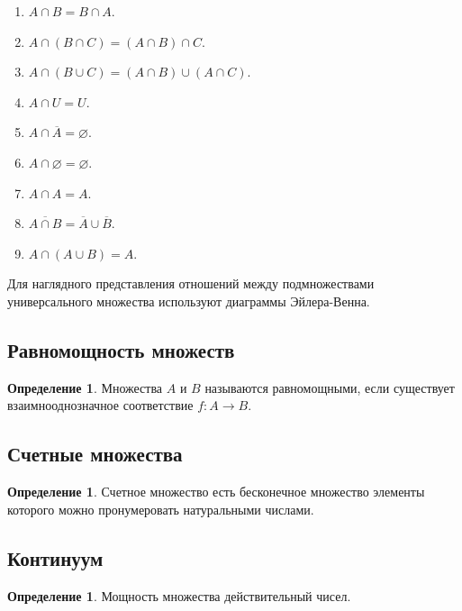 \documentclass[12pt]{report}
\theoremstyle{definition}
\newtheorem{definition}[theorem]{Определение}
\begin{document}
\begin{enumerate}
\item $A \cap B = B \cap A$.
\item $A \cap (B \cap C) = (A \cap B) \cap C$.
\item $A \cap (B \cup C) = (A \cap B) \cup (A \cap C)$.
\item $A \cap U = U$.
\item $A \cap \overline{A} = \varnothing$.
\item $A \cap \varnothing = \varnothing$.
\item $A \cap A = A$.
\item $\overline{A \cap B} = \overline{A} \cup \overline{B}$.
\item $A \cap (A \cup B) = A$.
\end{enumerate}

Для наглядного представления отношений между подмножествами
универсального множества используют диаграммы Эйлера-Венна.

\subsection{Равномощность множеств}
\begin{definition}
Множества $A$ и $B$ называются равномощными, если существует взаимнооднозначное
соответствие $f: A \rightarrow B$.
\end{definition}

\subsection{Счетные множества}
\begin{definition}
Счетное множество есть бесконечное множество элементы которого
можно пронумеровать натуральными числами.
\end{definition}

\subsection{Континуум}
\begin{definition}
Мощность множества действительный чисел.
\end{definition}

\end{document}
